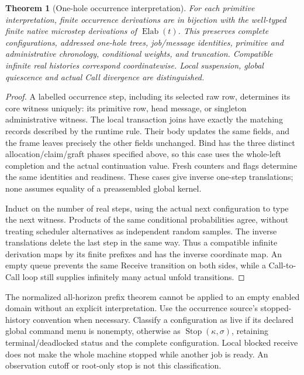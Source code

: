 \documentclass[11pt]{article}
\newtheorem{theorem}{Theorem}
\begin{document}
\begin{theorem}[One-hole occurrence interpretation]\label{thm:occurrence-interpretation}
For each primitive interpretation, finite occurrence derivations are in bijection with the well-typed finite native microstep derivations of $\operatorname{Elab}(t)$. This preserves complete configurations, addressed one-hole trees, job/message identities, primitive and administrative chronology, conditional weights, and truncation. Compatible infinite real histories correspond coordinatewise. Local suspension, global quiescence and actual Call divergence are distinguished.
\end{theorem}
\begin{proof}
A labelled occurrence step, including its selected raw row, determines its core witness uniquely: its primitive row, head message, or singleton administrative witness. The local transaction joins have exactly the matching records described by the runtime rule. Their body updates the same fields, and the frame leaves precisely the other fields unchanged. Bind has the three distinct allocation/claim/graft phases specified above, so this case uses the whole-left completion and the actual continuation value. Fresh counters and flags determine the same identities and readiness. These cases give inverse one-step translations; none assumes equality of a preassembled global kernel.

Induct on the number of real steps, using the actual next configuration to type the next witness. Products of the same conditional probabilities agree, without treating scheduler alternatives as independent random samples. The inverse translations delete the last step in the same way. Thus a compatible infinite derivation maps by its finite prefixes and has the inverse coordinate map. An empty queue prevents the same Receive transition on both sides, while a Call-to-Call loop still supplies infinitely many actual unfold transitions.
\end{proof}

The normalized all-horizon prefix theorem cannot be applied to an empty enabled domain without an explicit interpretation. Use the occurrence source's stopped-history convention when necessary. Classify a configuration as live if its declared global command menu is nonempty, otherwise as $\operatorname{Stop}(\kappa,\sigma)$, retaining terminal/deadlocked status and the complete configuration. Local blocked receive does not make the whole machine stopped while another job is ready. An observation cutoff or root-only stop is not this classification.
\end{document}
